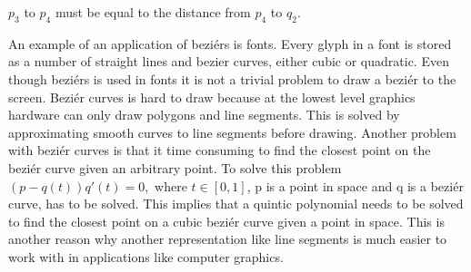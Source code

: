 \begin{math}p_3\end{math} to \begin{math}p_4\end{math} must be equal to the distance from \begin{math}p_4\end{math} to \begin{math}q_2\end{math}.

An example of an application of beziérs is fonts. Every glyph in a font is stored as a number of straight lines and bezier curves, either cubic or quadratic.\citep{phinney2001} Even though beziérs is used in fonts it is not a trivial problem to draw a beziér to the screen. Beziér curves is hard to draw because at the lowest level graphics hardware can only draw polygons and line segments. This is solved by approximating smooth curves to line segments before drawing. \citep{shreiner2009opengl} Another problem with beziér curves is that it time consuming to find the closest point on the beziér curve given an arbitrary point. To solve this problem \begin{math}(p-q(t))q'(t)=0,\end{math} where \begin{math}t\in[0, 1] \end{math}, p is a point in space and q is a beziér curve, has to be solved\citep{xiaodiao}. This implies that a quintic polynomial needs to be solved to find the closest point on a cubic beziér curve given a point in space. This is another reason why another representation like line segments is much easier to work with in applications like computer graphics.

